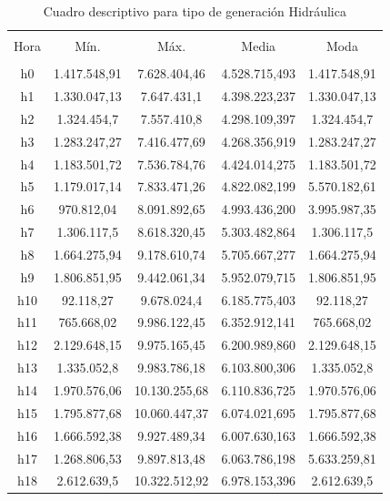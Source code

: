 \documentclass[conference, 10pt]{IEEEtran}
\begin{document}
\begin{table}[!htbp] \centering 
  \caption{Cuadro descriptivo para tipo de generación Hidráulica} 
  \begin{tabular}{@{\extracolsep{5pt}} ccccc} 
\\[-1.8ex]\hline 
\hline \\[-1.8ex] 
Hora & Mín. & Máx. & Media & Moda \\ 
\hline \\[-1.8ex] 
h0 & 1.417.548,91 & 7.628.404,46 & 4.528.715,493& 1.417.548,91 \\ 
h1 & 1.330.047,13 & 7.647.431,1 & 4.398.223,237& 1.330.047,13 \\ 
h2 & 1.324.454,7 & 7.557.410,8 & 4.298.109,397& 1.324.454,7 \\ 
h3 & 1.283.247,27 & 7.416.477,69 & 4.268.356,919& 1.283.247,27 \\ 
h4 & 1.183.501,72 & 7.536.784,76 & 4.424.014,275& 1.183.501,72 \\ 
h5 & 1.179.017,14 & 7.833.471,26 & 4.822.082,199& 5.570.182,61 \\ 
h6 & 970.812,04 & 8.091.892,65 & 4.993.436,200& 3.995.987,35 \\ 
h7 & 1.306.117,5 & 8.618.320,45 & 5.303.482,864& 1.306.117,5 \\ 
h8 & 1.664.275,94 & 9.178.610,74 & 5.705.667,277& 1.664.275,94 \\ 
h9 & 1.806.851,95 & 9.442.061,34 & 5.952.079,715& 1.806.851,95 \\ 
h10 & 92.118,27 & 9.678.024,4 & 6.185.775,403& 92.118,27 \\ 
h11 & 765.668,02 & 9.986.122,45 & 6.352.912,141& 765.668,02 \\ 
h12 & 2.129.648,15 & 9.975.165,45 & 6.200.989,860& 2.129.648,15 \\ 
h13 & 1.335.052,8 & 9.983.786,18 & 6.103.800,306& 1.335.052,8 \\ 
h14 & 1.970.576,06 & 10.130.255,68 & 6.110.836,725& 1.970.576,06 \\ 
h15 & 1.795.877,68 & 10.060.447,37 & 6.074.021,695& 1.795.877,68 \\ 
h16 & 1.666.592,38 & 9.927.489,34 & 6.007.630,163& 1.666.592,38 \\ 
h17 & 1.268.806,53 & 9.897.813,48 & 6.063.786,198& 5.633.259,81 \\ 
h18 & 2.612.639,5 & 10.322.512,92 & 6.978.153,396& 2.612.639,5 \\ 

\end{tabular}
\end{table}
\end{document}
